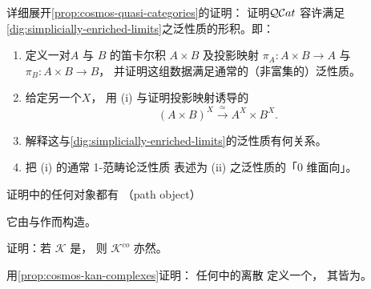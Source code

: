 \begin{exercise}\label{ex:conical-products-qcat}
详细展开\cref{prop:cosmos-quasi-categories}的证明：
证明\trSimpliciallyEnrichedCategory $\mathcal{Q}\mathcal{C}at$
容许满足\cref{dig:simplicially-enriched-limits}之泛性质的\trCone{}形积。即：
\begin{enumerate}[label=(\roman*)]
\item 定义一对\trQuasiCategory $A$ 与 $B$ 的笛卡尔积 $A\times B$
  及投影映射 $\pi_A\colon A\times B\to A$
  与 $\pi_B\colon A\times B\to B$，
  并证明这组数据满足通常的（非富集的）泛性质。
\item 给定另一个\trQuasiCategory $X$，
  用 (i) 与\trYonedaLemma{}证明投影映射诱导\trQuasiCategory{}的\trIsomorphism
  \begin{equation*}
  (A\times B)^X\xrightarrow{\ \simeq\ }A^X\times B^X.
  \end{equation*}
\item 解释这与\cref{dig:simplicially-enriched-limits}的泛性质有何关系。
\item 把 (i) 的通常 1-范畴论泛性质
  表述为 (ii) 之泛性质的「$0$ 维面向」。
\end{enumerate}
\end{exercise}

\begin{exercise}\label{ex:path-object}
证明\trInfinityCosmos{}中的任何对象都有\textbf{\trPathObject}
（path object）
\begin{center}
\end{center}
它由与\trFreeLivingIsomorphism{}作\trCotensor{}而构造。
\end{exercise}

\begin{exercise}\label{ex:dual-cartesian-closed}
证明：若 $\mathcal{K}$ 是\trCartesianClosed\trInfinityCosmos{}，
则 $\mathcal{K}^{co}$ 亦然。
\end{exercise}

\begin{exercise}[6.1.6]\label{ex:discrete-cosmos}
用\cref{prop:cosmos-kan-complexes}证明：
任何\trInfinityCosmos{}中的离散\trInfinityCategory{}%
定义一个\trInfinityCosmos{}，
其\trFunctorSpace{}皆为\trKanComplex{}。
\end{exercise}
